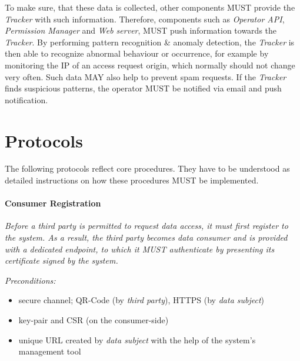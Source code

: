 \documentclass[12pt,english,a4paper,titlepage,cleardoublepage=empty,dottedtoc]{report}
\providecommand{\tightlist}{%
  \setlength{\itemsep}{0pt}\setlength{\parskip}{0pt}}
\begin{document}
To make sure, that these data is collected, other components MUST
provide the \emph{Tracker} with such information. Therefore, components
such as \emph{Operator API}, \emph{Permission Manager} and \emph{Web
server}, MUST push information towards the \emph{Tracker}. By performing
pattern recognition \& anomaly detection, the \emph{Tracker} is then
able to recognize abnormal behaviour or occurrence, for example by
monitoring the IP of an access request origin, which normally should not
change very often. Such data MAY also help to prevent spam requests. If
the \emph{Tracker} finds suspicious patterns, the operator MUST be
notified via email and push notification.

\section{Protocols}\label{protocols}

The following protocols reflect core procedures. They have to be
understood as detailed instructions on how these procedures MUST be
implemented.

\paragraph{Consumer Registration}\label{consumer-registration}

\emph{Before a third party is permitted to request data access, it must
first register to the system. As a result, the third party becomes data
consumer and is provided with a dedicated endpoint, to which it MUST
authenticate by presenting its certificate signed by the system.}

\emph{Preconditions:}

\begin{itemize}
\tightlist
\item
  secure channel; QR-Code (by \emph{third party}), HTTPS (by \emph{data
  subject})
\item
  key-pair and CSR (on the consumer-side)
\item
  unique URL created by \emph{data subject} with the help of the
  system's management tool
\end{itemize}
\end{document}
